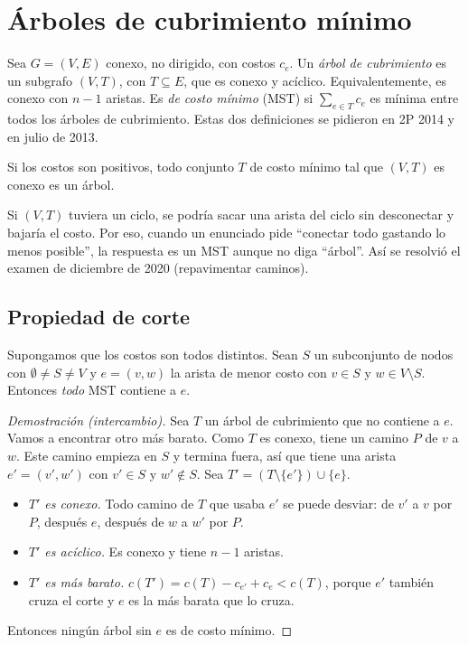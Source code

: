 \section{Árboles de cubrimiento mínimo}

Sea $G=(V,E)$ conexo, no dirigido, con costos $c_e$. Un \emph{árbol de cubrimiento} es un subgrafo $(V,T)$, con $T\subseteq E$, que es conexo y acíclico. Equivalentemente, es conexo con $n-1$ aristas. Es \emph{de costo mínimo} (MST) si $\sum_{e\in T}c_e$ es mínima entre todos los árboles de cubrimiento. Estas dos definiciones se pidieron en 2P 2014 y en julio de 2013.

\begin{resultado}[(4.16)]
Si los costos son positivos, todo conjunto $T$ de costo mínimo tal que $(V,T)$ es conexo es un árbol.
\end{resultado}
Si $(V,T)$ tuviera un ciclo, se podría sacar una arista del ciclo sin desconectar y bajaría el costo. Por eso, cuando un enunciado pide ``conectar todo gastando lo menos posible'', la respuesta es un MST aunque no diga ``árbol''. Así se resolvió el examen de diciembre de 2020 (repavimentar caminos).

\subsection{Propiedad de corte}

\begin{resultado}
Supongamos que los costos son todos distintos. Sean $S$ un subconjunto de nodos con $\emptyset\neq S\neq V$ y $e=(v,w)$ la arista de menor costo con $v\in S$ y $w\in V\setminus S$. Entonces \emph{todo} MST contiene a $e$.
\end{resultado}

\begin{proof}[Demostración (intercambio)]
Sea $T$ un árbol de cubrimiento que no contiene a $e$. Vamos a encontrar otro más barato. Como $T$ es conexo, tiene un camino $P$ de $v$ a $w$. Este camino empieza en $S$ y termina fuera, así que tiene una arista $e'=(v',w')$ con $v'\in S$ y $w'\notin S$. Sea $T'=(T\setminus\{e'\})\cup\{e\}$.
\begin{itemize}
  \item \emph{$T'$ es conexo.} Todo camino de $T$ que usaba $e'$ se puede desviar: de $v'$ a $v$ por $P$, después $e$, después de $w$ a $w'$ por $P$.
  \item \emph{$T'$ es acíclico.} Es conexo y tiene $n-1$ aristas.
  \item \emph{$T'$ es más barato.} $c(T')=c(T)-c_{e'}+c_e<c(T)$, porque $e'$ también cruza el corte y $e$ es la más barata que lo cruza.
\end{itemize}
Entonces ningún árbol sin $e$ es de costo mínimo.
\end{proof}


